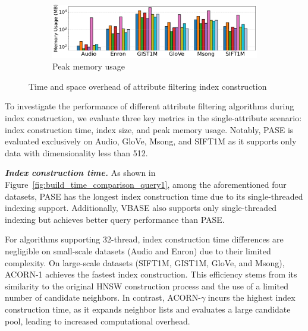 \documentclass[sigconf, nonacm]{acmart}
\begin{document}
\begin{sloppypar}
\begin{figure}[t]
    \vspace{0.3cm} %

    \begin{subfigure}{\columnwidth}
        \centering
        \setlength{\abovecaptionskip}{0cm}
        \setlength{\belowcaptionskip}{-0.3cm}
        \includegraphics[width=\linewidth]{figures/indexData/exp_7_memory_mb_comparison_query1.pdf}
        \caption{Peak memory usage}
        \label{fig:memory_mb_comparison_query1}
    \end{subfigure}

    \caption{Time and space overhead of attribute filtering index construction}
    \label{fig:build_index_comparison}
\end{figure}

\vspace{0.5em}

To investigate the performance of different attribute filtering algorithms during index construction, we evaluate three key metrics in the single-attribute scenario: index construction time, index size, and peak memory usage. Notably, PASE is evaluated exclusively on Audio, GloVe, Msong, and SIFT1M as it supports only data with dimensionality less than 512.

\vspace{0.5em}
\textit{\textbf{Index construction time.}}
As shown in Figure~\ref{fig:build_time_comparison_query1}, among the aforementioned four datasets, PASE has the longest index construction time due to its single-threaded indexing support. Additionally, VBASE also supports only single-threaded indexing but achieves better query performance than PASE.

For algorithms supporting 32-thread, index construction time differences are negligible on small-scale datasets (Audio and Enron) due to their limited complexity. On large-scale datasets (SIFT1M, GIST1M, GloVe, and Msong), ACORN-1 achieves the fastest index construction. This efficiency stems from its similarity to the original HNSW construction process and the use of a limited number of candidate neighbors. In contrast, ACORN-$\gamma$ incurs the highest index construction time, as it expands neighbor lists and evaluates a large candidate pool, leading to increased computational overhead.


\end{sloppypar}
\end{document}
